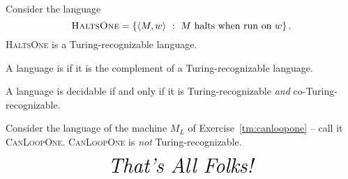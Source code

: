 \documentclass[twoside,letterpaper,openany]{book}
\begin{document}
\begin{stmt}
Consider the language \[\textsc{HaltsOne} = \left\lbrace {\langle{M, w}\rangle}\ :\ M~\textrm{halts when run on}~w \right\rbrace.\]
\textsc{HaltsOne} is a Turing-recognizable language.
\end{stmt}

\begin{defn}
A language is  if it is the complement of a Turing-recognizable language.
\end{defn}

\begin{thm}
A language is decidable if and only if it is Turing-recognizable \emph{and} co-Turing-recognizable.
\end{thm}

\begin{stmt}
Consider the language of the machine $M_L$ of Exercise~\ref{tm:canloopone} -- call it \textsc{CanLoopOne}. 
\textsc{CanLoopOne} is \emph{not} Turing-recognizable.
\end{stmt}

\vspace{1in}
\[\huge\textit{That's All Folks!}\]













\end{document}
